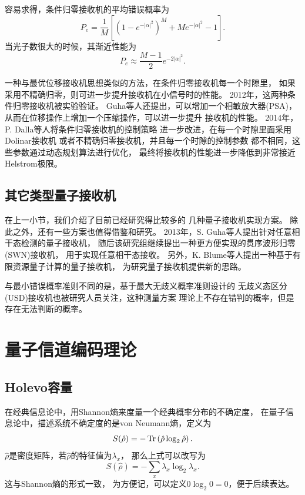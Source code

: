 容易求得，条件归零接收机的平均错误概率为\cite{guha2011approaching,dolinar1982near}
\begin{equation}
P_e = \frac{1}{M}[(1-e^{-|\alpha|^2})^M + M e^{-|\alpha|^2} - 1].
\end{equation}
当光子数很大的时候，其渐近性能为
\begin{equation}
P_e \approx \frac{M-1}{2} e^{-2|\alpha|^2}.
\end{equation}

一种与最优位移接收机思想类似的方法，在条件归零接收机每一个时隙里，
如果采用不精确归零，则可进一步提升接收机在小信号时的性能\cite{guha2011approaching}。
2012年，这两种条件归零接收机被实验验证\cite{chen2012optical}。
Guha等人还提出，可以增加一个相敏放大器(PSA)，
从而在位移操作上增加一个压缩操作，可以进一步提升
接收机的性能\cite{guha2011approaching}。
2014年，P. Dalla等人将条件归零接收机的控制策略
进一步改进，在每一个时隙里面采用Dolinar接收机
或者不精确归零接收机，并且每一个时隙的控制参数
都不相同，这些参数通过动态规划算法进行优化，
最终将接收机的性能进一步降低到非常接近Helstrom极限\cite{dalla2014adaptive}。



\subsection{其它类型量子接收机}
在上一小节，我们介绍了目前已经研究得比较多的
几种量子接收机实现方案。
除此之外，还有一些方案也值得借鉴和研究。
2013年，S. Guha等人提出针对任意相干态检测的量子接收机\cite{da2013achieving}，
随后该研究组继续提出一种更方便实现的贯序波形归零(SWN)接收机，
用于实现任意相干态接收\cite{nair2014realizable}。
另外，K. Blume等人提出一种基于有限资源量子计算的量子接收机\cite{blume2012ideal}，
为研究量子接收机提供新的思路。

与最小错误概率准则不同的是，基于最大无歧义概率准则设计的
无歧义态区分(USD)接收机也被研究人员关注，这种测量方案
理论上不存在错判的概率，但是存在无法判断的概率\cite{becerra2013implementation}。



\section{量子信道编码理论}

\subsection{Holevo容量}
在经典信息论中，用Shannon熵来度量一个经典概率分布的不确定度\cite{jd2001xxlybm}，
在量子信息论中，描述系统不确定度的是von Neumann熵，定义为\cite{nielsen2005qcqi,nielsen2010quantum}
\begin{equation}
S(\hat{\rho}) = -\Tr\left( \hat{\rho} \log_2 \hat{\rho} \right).
\end{equation}
$\hat{\rho}$是密度矩阵，若$\hat{\rho}$的特征值为$\lambda_x$，
那么上式可以改写为
\begin{equation}
S(\hat{\rho}) = -\sum_x \lambda_x \log_2 \lambda_x.
\end{equation}
这与Shannon熵的形式一致，
为方便记，可以定义$0\log_2 0=0$，便于后续表达。

